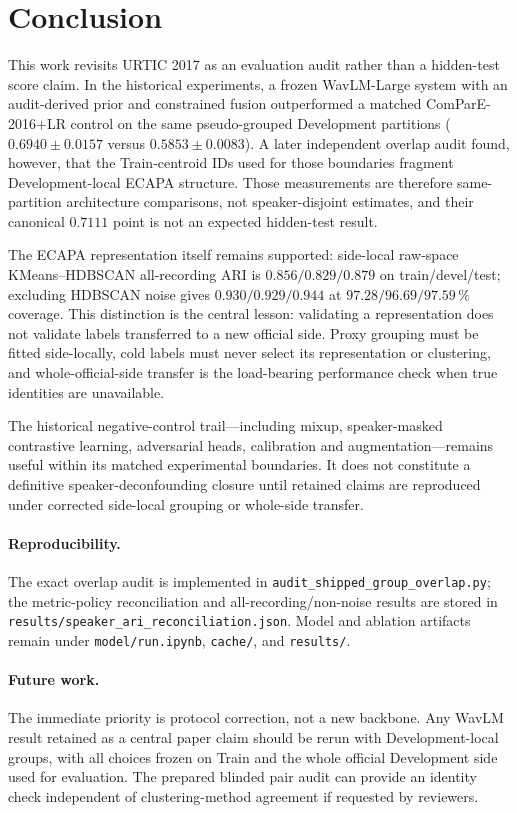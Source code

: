 \section{Conclusion}
\label{sec:conc}

This work revisits URTIC 2017 as an evaluation audit rather than a hidden-test
score claim. In the historical experiments, a frozen WavLM-Large system with an
audit-derived prior and constrained fusion outperformed a matched
ComParE-2016$+$LR control on the same pseudo-grouped Development partitions
($0.6940 \pm 0.0157$ versus $0.5853 \pm 0.0083$). A later independent overlap
audit found, however, that the Train-centroid IDs used for those boundaries
fragment Development-local ECAPA structure. Those measurements are therefore
same-partition architecture comparisons, not speaker-disjoint estimates, and
their canonical $0.7111$ point is not an expected hidden-test result.

The ECAPA representation itself remains supported: side-local raw-space
KMeans--HDBSCAN all-recording ARI is $0.856/0.829/0.879$ on
train/devel/test; excluding HDBSCAN noise gives $0.930/0.929/0.944$ at
$97.28/96.69/97.59\,\%$ coverage. This distinction is the central lesson:
validating a representation does not validate labels transferred to a new
official side. Proxy grouping must be fitted side-locally, cold labels must
never select its representation or clustering, and whole-official-side transfer
is the load-bearing performance check when true identities are unavailable.

The historical negative-control trail---including mixup, speaker-masked
contrastive learning, adversarial heads, calibration and augmentation---remains
useful within its matched experimental boundaries. It does not constitute a
definitive speaker-deconfounding closure until retained claims are reproduced
under corrected side-local grouping or whole-side transfer.

\paragraph{Reproducibility.} The exact overlap audit is implemented in
\texttt{audit\_shipped\_group\_overlap.py}; the metric-policy reconciliation and
all-recording/non-noise results are stored in
\texttt{results/speaker\_ari\_reconciliation.json}. Model and ablation artifacts
remain under \texttt{model/run.ipynb}, \texttt{cache/}, and \texttt{results/}.

\paragraph{Future work.} The immediate priority is protocol correction, not a
new backbone. Any WavLM result retained as a central paper claim should be
rerun with Development-local groups, with all choices frozen on Train and the
whole official Development side used for evaluation. The prepared blinded
pair audit can provide an identity check independent of clustering-method
agreement if requested by reviewers.
